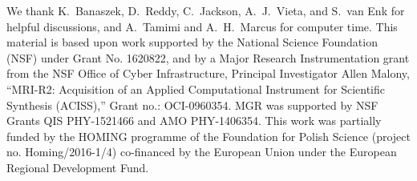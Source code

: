 \documentclass[twocolumn,amssymb, nobibnotes, showpacs, aps, pra,10pt]{revtex4-1}
\begin{document}
\begin{acknowledgements}
We thank K.\ Banaszek, D.\ Reddy, C.\ Jackson, A.~J.\ Vieta, and S.\ van Enk for helpful discussions, and A.\ Tamimi and A.\ H.\ Marcus for computer time. This material is based upon work supported by the National Science Foundation (NSF) under Grant No. 1620822, and by a Major Research Instrumentation grant from the NSF Office of Cyber Infrastructure, Principal Investigator Allen Malony, ``MRI-R2: Acquisition of an Applied Computational Instrument for Scientific Synthesis (ACISS),'' Grant no.: OCI-0960354. MGR was supported by NSF Grants QIS PHY-1521466 and AMO PHY-1406354. This work was partially funded by the HOMING programme of the Foundation for Polish Science (project no. Homing/2016-1/4) co-financed by the European Union under the European Regional Development Fund.
\end{acknowledgements}

\appendix
\end{document}
